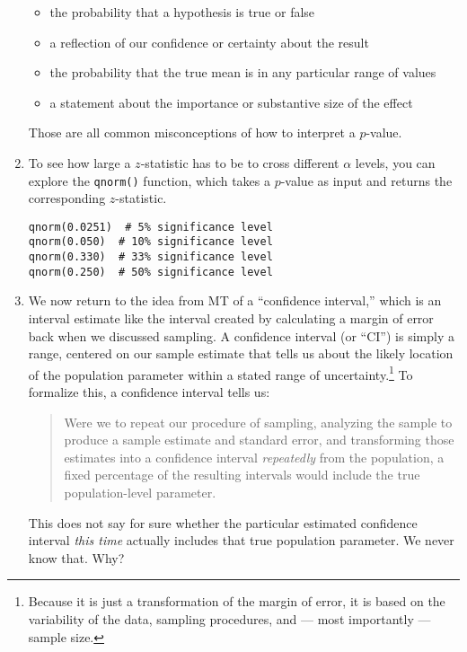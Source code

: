 \documentclass[a4paper,12pt]{article}
\begin{document}
\begin{enumerate}
\begin{itemize}
\item the probability that a hypothesis is true or false
\item a reflection of our confidence or certainty about the result
\item the probability that the true mean is in any particular range of values
\item a statement about the importance or substantive size of the effect
\end{itemize}

\noindent Those are all common misconceptions of how to interpret a $p$-value.

\item To see how large a $z$-statistic has to be to cross different $\alpha$ levels, you can explore the \texttt{qnorm()} function, which takes a $p$-value as input and returns the corresponding $z$-statistic.

\begin{verbatim}
qnorm(0.0251)  # 5% significance level
qnorm(0.050)  # 10% significance level
qnorm(0.330)  # 33% significance level
qnorm(0.250)  # 50% significance level
\end{verbatim}

\item We now return to the idea from MT of a ``confidence interval,'' which is an interval estimate like the interval created by calculating a margin of error back when we discussed sampling. A confidence interval (or ``CI'') is simply a range, centered on our sample estimate that tells us about the likely location of the population parameter within a stated range of uncertainty.\footnote{Because it is just a transformation of the margin of error, it is based on the variability of the data, sampling procedures, and --- most importantly --- sample size.} To formalize this, a confidence interval tells us:

\begin{quote}
Were we to repeat our procedure of sampling, analyzing the sample to produce a sample estimate and standard error, and transforming those estimates into a confidence interval \textit{repeatedly} from the population, a fixed percentage of the resulting intervals would include the true population-level parameter.
\end{quote}
        
\noindent This does not say for sure whether the particular estimated confidence interval \textit{this time} actually includes that true population parameter. We never know that. Why?


\end{enumerate}
\end{document}
